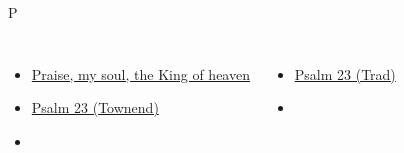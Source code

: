 \documentclass[aspectratio=169]{beamer}
\begin{document}
\begin{frame}[t]{P}
\begin{columns}[t]
\begin{itemize}
    \item \hyperlink{Praise, my soul, the King of heaven[]}{Praise, my soul, the King of heaven}
    \item \hyperlink{The Lord's my Shepherd['Psalm 23'](Townend)}{Psalm 23 (Townend)}
    \item[] \phantom{1}
\end{itemize}
\begin{itemize}
    \item \hyperlink{The Lord's my Shepherd['Psalm 23'](Trad)}{Psalm 23 (Trad)}
    \item[] \phantom{1}
\end{itemize}
\end{columns}
\end{frame}
\end{document}
